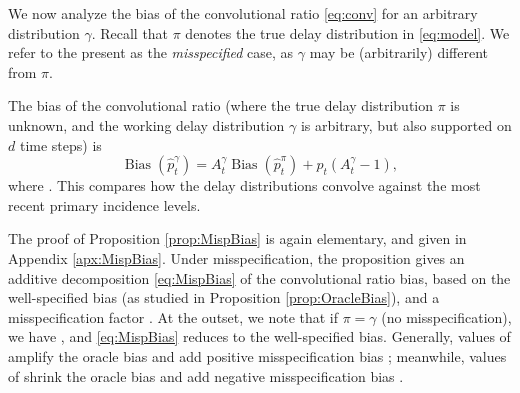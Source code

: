 \documentclass{article}
\renewcommand{\hat}{\widehat} %
\DeclareMathOperator{\bias}{Bias}
\begin{document}
We now analyze the bias of the convolutional ratio \eqref{eq:conv} for an
arbitrary distribution $\gamma$. Recall that $\pi$ denotes the true delay
distribution in \eqref{eq:model}. We refer to the present as the
\emph{misspecified} case, as $\gamma$ may be (arbitrarily) different from $\pi$.    

\begin{proposition}
\label{prop:MispBias}
The bias of the convolutional ratio \smash{$\hat{p}_t^\gamma$} (where the true 
delay distribution $\pi$ is unknown, and the working delay distribution $\gamma$
is arbitrary, but also supported on $d$ time steps) is
\begin{equation}
\label{eq:MispBias}
\bias(\hat{p}_t^\gamma) = A_t^\gamma \bias(\hat{p}_t^\pi) + p_t (A_t^\gamma-1),  
\end{equation}
where . This compares how the delay distributions convolve against  
the most recent primary incidence levels. 
\end{proposition}

The proof of Proposition \ref{prop:MispBias} is again elementary, and given in 
Appendix \ref{apx:MispBias}. Under misspecification, the proposition gives an
additive decomposition \eqref{eq:MispBias} of the convolutional ratio bias,
based on the well-specified bias \smash{$\bias(\hat{p}_t^\pi)$} (as studied in
Proposition \ref{prop:OracleBias}), and a misspecification factor
. At the outset, we note that if $\pi = \gamma$ (no  
misspecification), we have , and \eqref{eq:MispBias}
reduces to the well-specified bias. Generally, values of  amplify the oracle bias and add positive misspecification bias ; meanwhile, values of  shrink the
oracle bias and add negative misspecification bias . 
\end{document}
